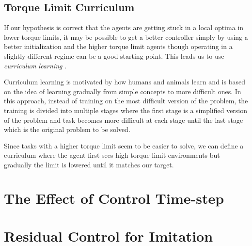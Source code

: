 \subsection{Torque Limit Curriculum}
If our hypothesis is correct that the agents are getting stuck in a local optima in lower torque limits, it may be possible to get a better controller simply by using a better initialization and the higher torque limit agents though operating in a slightly different regime can be a good starting point. This leads us to use \textit{curriculum learning} \cite{Bengio:2009:CL:1553374.1553380}.

Curriculum learning is motivated by how humans and animals learn and is based on the idea of learning gradually from simple concepts to more difficult ones. In this approach, instead of training on the most difficult version of the problem, the training is divided into multiple stages where the first stage is a simplified version of the problem and task becomes more difficult at each stage until the last stage which is the original problem to be solved.

Since tasks with a higher torque limit seem to be easier to solve, we can define a curriculum where the agent first sees high torque limit environments but gradually the limit is lowered until it matches our target.


\section{The Effect of Control Time-step}
\label{sec:params_ts}

\section{Residual Control for Imitation}
\label{sec:params_residual}
